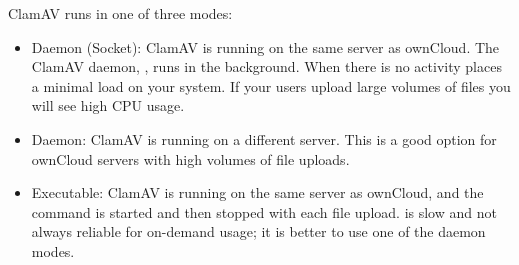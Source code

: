 \documentclass[letterpaper,10pt,english]{sphinxmanual}
\begin{document}
ClamAV runs in one of three modes:
\begin{itemize}
\item {} 
Daemon (Socket): ClamAV is running on the same server as ownCloud. The ClamAV
daemon, , runs in the background. When there is no activity 
places a minimal load on your system. If your users upload large volumes of
files you will see high CPU usage.

\item {} 
Daemon: ClamAV is running on a different server. This is a good option
for ownCloud servers with high volumes of file uploads.

\item {} 
Executable: ClamAV is running on the same server as ownCloud, and the
 command is started and then stopped with each file upload.
 is slow and not always reliable for on-demand usage; it is
better to use one of the daemon modes.

\end{itemize}
\end{document}
